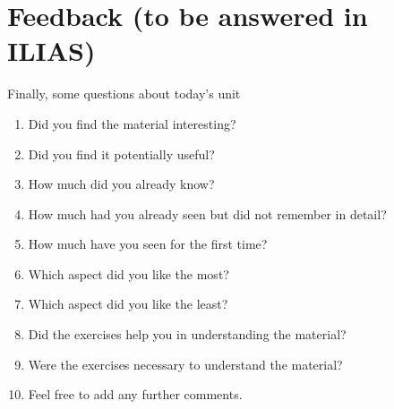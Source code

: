 \documentclass[twoside,a4paper]{article}
\begin{document}
\section{Feedback (to be answered in ILIAS)}


\begin{exercise}[5]
  Finally, some questions about today's unit
  \begin{enumerate}
  \item Did you find the material interesting?
  \item Did you find it potentially useful?
  \item How much did you already know?
  \item How much had you already seen but did not remember in detail?
  \item How much have you seen for the first time?
  \item Which aspect did you like the most?
  \item Which aspect did you like the least?
  \item Did the exercises help you in understanding the material?
  \item Were the exercises necessary to understand the material?
  \item Feel free to add any further comments.
  \end{enumerate}
\end{exercise}
\end{document}
